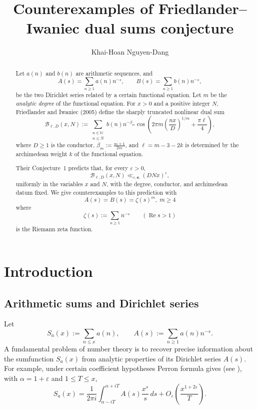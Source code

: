\documentclass[11pt]{amsart}
\title[Counterexamples of  Friedlander--Iwaniec dual sums conjecture]
{Counterexamples of Friedlander--Iwaniec dual sums conjecture}
\author{Khai-Hoan Nguyen-Dang}
\theoremstyle{plain}
\theoremstyle{definition}
\theoremstyle{remark}
\numberwithin{equation}{section}
\begin{document}
\begin{abstract}
Let $a(n)$ and $b(n)$ are arithmetic sequences, and
\[
  A(s)=\sum_{n\ge1}a(n)n^{-s},
  \qquad
  B(s)=\sum_{n\ge1}b(n)n^{-s},
\]
be the two Dirichlet series related by a certain
functional equation. Let $m$ be the \emph{analytic degree} of the functional equation.  For \(x>0\) and a positive integer \(N\), Friedlander and Iwaniec (2005) define the sharply truncated nonlinear dual sum
\[
  \mathcal B_{\ell,D}(x,N)
  :=
  \sum_{\substack{n\in\mathbb N\\ n\le N}}
  b(n)n^{-\beta_m}
  \cos\!\left(
    2\pi m\left(\frac{nx}{D}\right)^{1/m}
    +\frac{\pi\ell}{4}
  \right),
\]
where
\(D\ge1\) is the conductor, \(\beta_m:=\frac{m+1}{2m}\), and \(\ell=m-3-2k\)
is determined by the archimedean weight \(k\) of the functional equation. 

Their Conjecture~1 predicts that, for every \(\varepsilon>0\),
\[
  \mathcal B_{\ell,D}(x,N)
  \ll_{\varepsilon,\boldsymbol\kappa}
  (DNx)^\varepsilon,
\]
uniformly in the variables \(x\) and \(N\), with the degree, conductor, and archimedean datum fixed.  We give counterexamples to this prediction with
\[
  A(s)=B(s)=\zeta(s)^m,\; m\geq 4
\]
where
\[
  \zeta(s):=\sum_{n\ge1}n^{-s}
  \qquad(\operatorname{Re}s>1)
\]
is the Riemann zeta function.
\end{abstract}



\maketitle

\section{Introduction}

\subsection{Arithmetic sums and Dirichlet series}
Let
\begin{equation}\label{eq:basic-data-intro}
  S_a(x):=\sum_{n\le x}a(n),
  \qquad
  A(s):=\sum_{n\ge1}a(n)n^{-s}.
\end{equation}
A fundamental problem of number theory is to recover precise information about the sumfunction $S_a(x)$ from analytic properties of its Dirichlet series $A(s)$. For example, under certain coefficient hypotheses Perron formula gives (see \cite[Lemma~3.12]{Titchmarsh}), with $\alpha=1+\varepsilon$ and $1\le T\le x$,
\begin{equation}\label{eq:Perron-intro}
  S_a(x)
  =\frac{1}{2\pi i}
   \int_{\alpha-iT}^{\alpha+iT}
     A(s)\frac{x^s}{s}\,ds
   +O_\varepsilon\!\left(\frac{x^{1+2\varepsilon}}{T}\right).
\end{equation}
\end{document}
